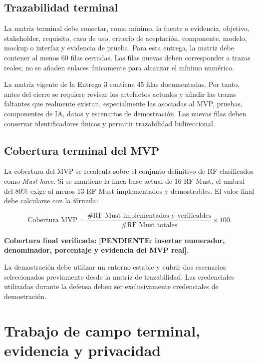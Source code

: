 \documentclass[12pt,journal,onecolumn]{IEEEtran}
\newcommand{\pendiente}[1]{\textcolor{red!70!black}{\textbf{[PENDIENTE: #1]}}}
\begin{document}
\subsection{Trazabilidad terminal}
\label{subsec:trazabilidad_terminal}

La matriz terminal debe conectar, como mínimo, la fuente o evidencia,
objetivo, stakeholder, requisito, caso de uso, criterio de aceptación,
componente, modelo, mockup o interfaz y evidencia de prueba. Para esta entrega,
la matriz debe contener al menos 60 filas cerradas. Las filas nuevas deben
corresponder a trazas reales; no se añaden enlaces únicamente para alcanzar
el mínimo numérico.

La matriz vigente de la Entrega 3 contiene 45 filas documentadas. Por tanto,
antes del cierre se requiere revisar los artefactos actuales y añadir las
trazas faltantes que realmente existan, especialmente las asociadas al MVP,
pruebas, componentes de IA, datos y escenarios de demostración. Las nuevas
filas deben conservar identificadores únicos y permitir trazabilidad
bidireccional.

\subsection{Cobertura terminal del MVP}
\label{subsec:mvp_terminal}

La cobertura del MVP se recalcula sobre el conjunto definitivo de RF
clasificados como \emph{Must have}. Si se mantiene la línea base actual de
16 RF Must, el umbral del 80\% exige al menos 13 RF Must implementados y
demostrables. El valor final debe calcularse con la fórmula:

\[
\text{Cobertura MVP} =
\frac{\#\text{RF Must implementados y verificables}}
{\#\text{RF Must totales}}
\times 100.
\]

\noindent
\textbf{Cobertura final verificada:}
\pendiente{insertar numerador, denominador, porcentaje y evidencia del MVP real}.

La demostración debe utilizar un entorno estable y cubrir dos escenarios
seleccionados previamente desde la matriz de trazabilidad. Las credenciales
utilizadas durante la defensa deben ser exclusivamente credenciales de
demostración.

\section{Trabajo de campo terminal, evidencia y privacidad}
\label{sec:campo_terminal}
\end{document}
